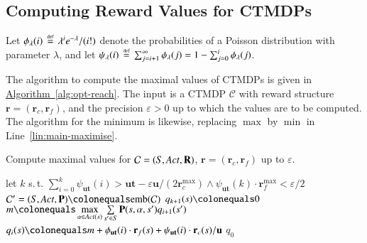 \documentclass[10pt,twocolumn]{article}
\renewcommand{\gets}{\colonequals}
\newcommand{\states} {{\ensuremath S}}
\newcommand{\state}  {{\ensuremath s}}
\newcommand{\acts}{\mathit{Act}}
\newcommand{\pmat}{\mathbf{P}}
\newcommand{\rmat}{\mathbf{R}}
\newcommand{\cmodel}{\mathcal{C}}
\newcommand{\urate}{\mathbf{u}}
\newcommand{\act}{\alpha}
\newcommand{\rew}{\mathbf{r}}
\newcommand{\frew}{\mathbf{r}_f}
\newcommand{\crew}{\mathbf{r}_c}
\newcommand{\timeb}{\mathbf{t}}
\newcommand{\precision}{\varepsilon}
\newcommand{\emb}{\mathrm{emb}}
\newcommand{\refalg}[1]{\texorpdfstring{\hyperref[alg:#1]{Algorithm~\ref*{alg:#1}}}{Algorithm~\ref*{alg:#1}}}
\newcommand{\defeq}{\,\stackrel{\mbox{\rm {\tiny def}}}{=}\,}
\begin{document}
\subsection{Computing Reward Values for CTMDPs}

\noindent Let $\phi_\lambda(i) \defeq \lambda^ie^{-\lambda}/(i!)$ denote 
the probabilities of a Poisson distribution with parameter $\lambda$, and let 
$\psi_\lambda(i) \defeq \sum_{j=i+1}^\infty \phi_\lambda(j) = 1 - \sum_{j=0}^i\phi_{\lambda}(j)$.

The algorithm to compute the maximal values of CTMDPs is given in \refalg{opt-reach}.
The input is a CTMDP $\cmodel$ with reward structure $\rew = (\crew, \frew)$,
and the precision $\precision>0$ up to which the values are to be computed.
The algorithm for the minimum is likewise, replacing $\max$ by $\min$
in Line~\ref{lin:main-maximise}.
\begin{algorithm}
  \caption{\label{alg:opt-reach}Compute maximal values for $\cmodel = (\states, \acts, \rmat)$, $\rew = (\crew, \frew)$ up to $\precision$.}
  \DontPrintSemicolon
  let $k$ s.\,t. $\sum_{i=0}^k\psi_{\urate \timeb}(i) > \urate \timeb -
  \precision \urate / (2\crew^{\max})
  \wedge \psi_{\urate \timeb}(k) \cdot \frew^{\max} <
  \precision/2$ \label{lin:choice_k} \;
  $\cmodel' = (\states, \acts, \pmat) \gets \emb(\cmodel)$ \;
  \lForAll{$\state \in \states$} {\label{lin:init}$q_{k+1}(\state) \gets 0$ \;
  }
   { \label{lin:main-start}
    \ForAll{$\state \in \states$} {
      $m \gets \max\limits_{\act\in\acts(s)} \sum\limits_{\state' \in S} \pmat(s,\act,s') q_{i+1}(s')$ \label{lin:asg-max} \; \label{lin:main-maximise}
      $q_i(\state) \gets m + \phi_{\urate \timeb}(i) \cdot \frew(\state) +
      \psi_{\urate \timeb}(i) \cdot \crew(\state)/\urate$ \;
      \label{lin:last-inner}
    }
  }
  \Return $q_0$
\end{algorithm}
\end{document}
